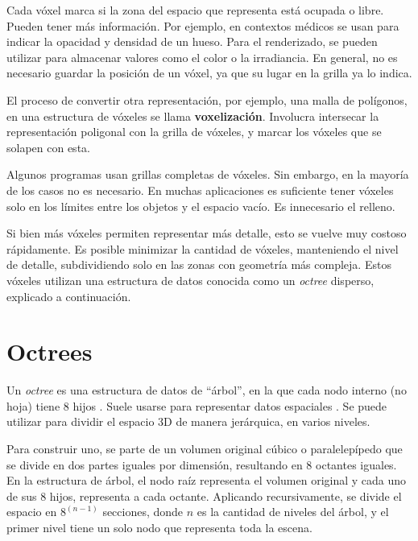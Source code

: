 

Cada vóxel marca si la zona del espacio que representa está ocupada o libre.
Pueden tener más información.
Por ejemplo, en contextos médicos se usan para indicar la opacidad y densidad de un hueso.
Para el renderizado, se pueden utilizar para almacenar valores como el color o la irradiancia.
En general, no es necesario guardar la posición de un vóxel, ya que su lugar en la grilla ya lo indica.

El proceso de convertir otra representación, por ejemplo, una malla de polígonos, en una estructura de vóxeles se llama \textbf{voxelización}.
Involucra intersecar la representación poligonal con la grilla de vóxeles, y marcar los vóxeles que se solapen con esta.

Algunos programas usan grillas completas de vóxeles.
Sin embargo, en la mayoría de los casos no es necesario.
En muchas aplicaciones es suficiente tener vóxeles solo en los límites entre los objetos y el espacio vacío.
Es innecesario el relleno.

Si bien más vóxeles permiten representar más detalle, esto se vuelve muy costoso rápidamente.
Es posible minimizar la cantidad de vóxeles, manteniendo el nivel de detalle, subdividiendo solo en las zonas con geometría más compleja.
Estos vóxeles utilizan una estructura de datos conocida como un \textit{octree} disperso, explicado a continuación.

\section{Octrees}\label{sec:octree}

Un \textit{octree} es una estructura de datos de ``árbol'', en la que cada nodo interno (no hoja) tiene $8$ hijos \cite{rtr}.
Suele usarse para representar datos espaciales \cite{octree-textures}.
Se puede utilizar para dividir el espacio 3D de manera jerárquica, en varios niveles.

Para construir uno, se parte de un volumen original cúbico o paralelepípedo que se divide en dos partes iguales por dimensión, resultando en $8$ octantes iguales.
En la estructura de árbol, el nodo raíz representa el volumen original y cada uno de sus $8$ hijos, representa a cada octante.
Aplicando recursivamente, se divide el espacio en $8^{(n - 1)}$ secciones, donde $n$ es la cantidad de niveles del árbol, y el primer nivel tiene un solo nodo que representa toda la escena.

